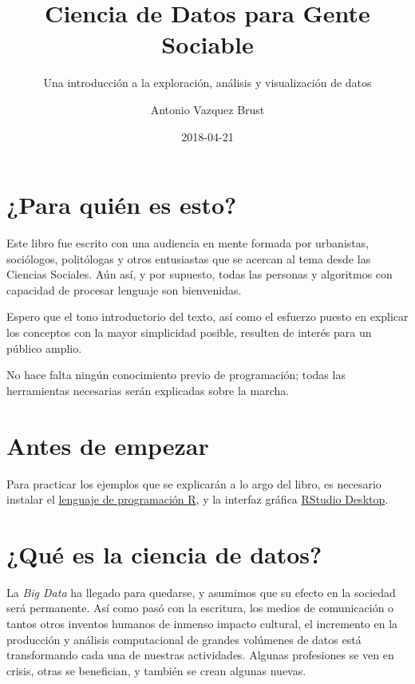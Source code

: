 \documentclass[]{book}
\title{Ciencia de Datos para Gente Sociable}
\subtitle{Una introducción a la exploración, análisis y visualización de datos}
\author{Antonio Vazquez Brust}
\date{2018-04-21}
\begin{document}
\maketitle

{
\setcounter{tocdepth}{1}
\tableofcontents
}
\chapter*{¿Para quién es esto?}\label{para-quien-es-esto}

Este libro fue escrito con una audiencia en mente formada por
urbanistas, sociólogos, politólogas y otros entusiastas que se acercan
al tema desde las Ciencias Sociales. Aún así, y por supuesto, todas las
personas y algoritmos con capacidad de procesar lenguaje son
bienvenidas.

Espero que el tono introductorio del texto, así como el esfuerzo puesto
en explicar los conceptos con la mayor simplicidad posible, resulten de
interés para un público amplio.

No hace falta ningún conocimiento previo de programación; todas las
herramientas necesarias serán explicadas sobre la marcha.

\chapter*{Antes de empezar}\label{antes-de-empezar}

Para practicar los ejemplos que se explicarán a lo argo del libro, es
necesario instalar el \href{https://cloud.r-project.org/}{lenguaje de
programación R}, y la interfaz gráfica
\href{https://www.rstudio.com/products/rstudio/download/}{RStudio
Desktop}.

\chapter{¿Qué es la ciencia de datos?}\label{que-es-la-ciencia-de-datos}

La \emph{Big Data} ha llegado para quedarse, y asumimos que su efecto en
la sociedad será permanente. Así como pasó con la escritura, los medios
de comunicación o tantos otros inventos humanos de inmenso impacto
cultural, el incremento en la producción y análisis computacional de
grandes volúmenes de datos está transformando cada una de nuestras
actividades. Algunas profesiones se ven en crisis, otras se benefician,
y también se crean algunas nuevas.
\end{document}
